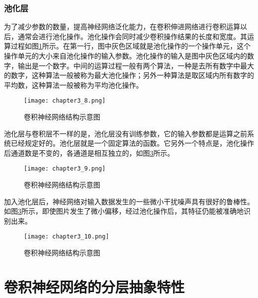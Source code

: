 \subsubsection{池化层}
为了减少参数的数量，提高神经网络泛化能力，在卷积伸进网络进行卷积运算以后，通常会进行池化操作。池化操作会同时减少卷积操作结果的长度和宽度。其运算过程如图\ref{fig:chapter3_8}所示。在第一行，图中灰色区域就是池化操作的一个操作单元，这个操作单元的大小来自池化操作的输入参数。池化操作的输入是图中灰色区域内的数字，输出是一个数字。中间的运算过程一般有两个算法，一种是去所有数字中最大的数字，这种算法一般被称为最大池化操作；另外一种算法是取区域内所有数字的平均数，这种算法一般被称为平均池化操作。
\begin{figure}
    \centering
    \texttt{[image: chapter3\_8.png]}
    \caption{卷积神经网络结构示意图}
    \label{fig:chapter3_8}
\end{figure}
池化层与卷积层不一样的是，池化层没有训练参数，它的输入参数都是运算之前系统已经规定好的。池化层就是一个固定算法的函数。它另外一个特点是，池化操作后通道数是不变的，各通道是相互独立的，如图\ref{fig:chapter3_10}所示。
\begin{figure}
    \centering
    \texttt{[image: chapter3\_9.png]}
    \caption{卷积神经网络结构示意图}
    \label{fig:chapter3_9}
\end{figure}
加入池化层后，神经网络对输入数据发生的一些微小干扰噪声具有很好的鲁棒性。如图\ref{fig:chapter3_10}所示，即使图片发生了微小偏移，经过池化操作后，其特征仍能被准确地识别出来。
\begin{figure}
    \centering
    \texttt{[image: chapter3\_10.png]}
    \caption{卷积神经网络结构示意图}
    \label{fig:chapter3_10}
\end{figure}
\section{卷积神经网络的分层抽象特性}
